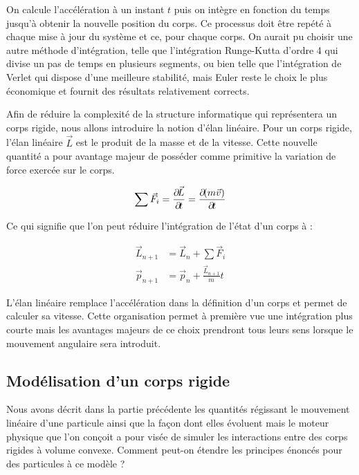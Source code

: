 On calcule l'accélération à un instant $t$ puis on intègre en fonction
du temps jusqu'à obtenir la nouvelle position du corps. Ce processus
doit être repété à chaque mise à jour du système et ce, pour chaque
corps. On aurait pu choisir une autre méthode d'intégration, telle que
l'intégration Runge-Kutta d'ordre 4 qui divise un pas de temps en
plusieurs segments, ou bien telle que l'intégration de Verlet qui
dispose d'une meilleure stabilité, mais Euler reste le choix le plus
économique et fournit des résultats relativement corrects.

Afin de réduire la complexité de la structure informatique qui
représentera un corps rigide, nous allons introduire la notion d'élan
linéaire. Pour un corps rigide, l'élan linéaire $\vec{L}$ est le
produit de la masse et de la vitesse. Cette nouvelle quantité a pour
avantage majeur de posséder comme primitive la variation de force
exercée sur le corps.

\begin{align*}
  {\sum \vec{F}_i} = \frac{\partial \! \vec{L}}{\partial \! t} = \frac{\partial \!
    (m\vec{v})}{\partial \! t}
\end{align*}

Ce qui signifie que l'on peut réduire l'intégration de l'état d'un
corps à :

\begin{align*}
  \vec{L}_{n+1} &= \vec{L}_n + {\sum \vec{F}_i} \\ \vec{p}_{n+1} &=
  \vec{p}_n + \frac{\vec{L}_{n+1}}{m} t
\end{align*}

L'élan linéaire remplace l'accélération dans la définition d'un corps
et permet de calculer sa vitesse. Cette organisation permet à première
vue une intégration plus courte mais les avantages majeurs de ce choix
prendront tous leurs sens lorsque le mouvement angulaire sera
introduit.

\subsection{Modélisation d'un corps rigide}

Nous avons décrit dans la partie précédente les quantités régissant le
mouvement linéaire d'une particule ainsi que la façon dont elles
évoluent mais le moteur physique que l'on conçoit a pour visée de
simuler les interactions entre des corps rigides à volume
convexe. Comment peut-on étendre les principes énoncés pour des
particules à ce modèle ?

